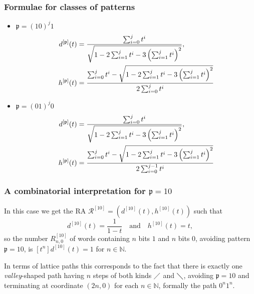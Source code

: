 \documentclass{beamer}
\begin{document}
\begin{frame}\frametitle{Formulae for classes of patterns}
{\small
\begin{itemize}
\item $\mathfrak{p}=(10)^j1$
\begin{displaymath}
\begin{split}
d^{[\mathfrak{p}]}(t)&={
\sum_{i=0}^j t^i \over \sqrt{1-2\sum_{i=1}^jt^i-3 \left(
\sum_{i=1}^j t^i \right)^2}}, \\
h^{[\mathfrak{p}]}(t)&={\sum_{i=0}^jt^i
-\sqrt{1-2\sum_{i=1}^jt^i-3\left( \sum_{i=1}^j t^i \right)^2}
\over 2 \sum_{i=0}^jt^i}
\end{split}
\end{displaymath}
\item
$\mathfrak{p}=(01)^j0$
\begin{displaymath}
\begin{split}
d^{[\mathfrak{p}]}(t)&={
\sum_{i=0}^j t^i \over \sqrt{1-2\sum_{i=1}^jt^i-3 \left( \sum_{i=1}^j t^i \right)^2}}, \\
h^{[\mathfrak{p}]}(t)&={\sum_{i=0}^jt^i -\sqrt{1-2\sum_{i=1}^jt^i-3\left( \sum_{i=1}^j t^i \right)^2} \over 2 \sum_{i=0}^{j-1}t^i}
\end{split}
\end{displaymath}

\end{itemize}
}
\end{frame}

\begin{frame}\frametitle{A combinatorial interpretation for $\mathfrak{p}=10$}

In this case we get the RA ${\mathcal{R}^{[10]}} = \left(d^{[10]}(t), h^{[10]}(t)\right)$ 
such that
\begin{displaymath} 
d^{[10]}(t)=\frac{1}{1-t} \quad \text{and} \quad h^{[10]}(t) = t, 
\end{displaymath} so the number $R_{n, 0}^{[10]}$ of words
containing $n$ bits $1$ and $n$ bits $0$, avoiding pattern $\mathfrak{p}=10$, is
$[t^{n}] d^{[10]}(t) = 1$ for $n\in\mathbb{N}$. 

In terms of lattice paths this corresponds to the fact that there is exactly
one \emph{valley}-shaped path having $n$ steps of both kinds $\diagup$ and
$\diagdown$, avoiding $\mathfrak{p}=10$ and terminating at coordinate $(2n, 0)$
for each $n\in\mathbb{N}$, formally the path $0^{n}1^{n}$.

\end{frame}


\iffalse
\begin{frame}\frametitle{A Lemma}

 Let $\mathfrak{p}$ be  a Riordan pattern. Then the Riordan array ${{R}^{[\mathfrak{p}]}}$ is characterized by the  $A$-matrix
defined by the following relation:
$$R_{n+1,k+1}^{[\mathfrak{p}]}=R_{n,k}^{[\mathfrak{p}]}
+R_{n+1,k+2}^{[\mathfrak{p}]}-R_{n+1-n_1^{\mathfrak{p}},k+1+n_0^{\mathfrak{p}}-n_1^{\mathfrak{p}}}^{[\mathfrak{p}]} +$$
$$- \sum_{i\geq 1} c_{2i}\left(  R_{n+1-i,k+1}^{[\mathfrak{p}]} -R_{n-i,k}^{[\mathfrak{p}]} -R_{n+1-i,k+2}^{[\mathfrak{p}]} \right),$$
where  the  $c_i$ are given by the autocorrelation vector of
$\mathfrak{p}.$
\end{frame}
\fi
\end{document}
